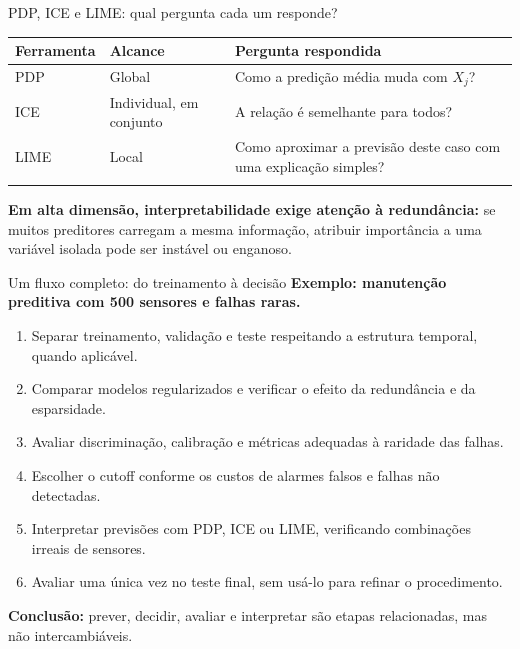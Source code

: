 \documentclass[
  10pt,
  ignorenonframetext,
  aspectratio=169,
  brazilian,
]{beamer}
\newcounter{none} %
\providecommand{\tightlist}{%
  \setlength{\itemsep}{0pt}\setlength{\parskip}{0pt}}
\begin{document}
\begin{frame}{PDP, ICE e LIME: qual pergunta cada um responde?}
\protect{}\label{pdp-ice-e-lime-qual-pergunta-cada-um-responde}
{\def\LTcaptype{none} %
\begin{longtable}[]{@{}
  >{\raggedright\arraybackslash}p{}
  >{\raggedright\arraybackslash}p{}
  >{\raggedright\arraybackslash}p{}@{}}
\toprule\noalign{}
\begin{minipage}[b]{\linewidth}\raggedright
Ferramenta
\end{minipage} & \begin{minipage}[b]{\linewidth}\raggedright
Alcance
\end{minipage} & \begin{minipage}[b]{\linewidth}\raggedright
Pergunta respondida
\end{minipage} \\
\midrule\noalign{}
\endhead
PDP & Global & Como a predição média muda com \(X_j\)? \\
ICE & Individual, em conjunto & A relação é semelhante para todos? \\
LIME & Local & Como aproximar a previsão deste caso com uma explicação
simples? \\
\bottomrule\noalign{}
\end{longtable}
}

\textbf{Em alta dimensão, interpretabilidade exige atenção à
redundância:} se muitos preditores carregam a mesma informação, atribuir
importância a uma variável isolada pode ser instável ou enganoso.
\end{frame}

\begin{frame}{Um fluxo completo: do treinamento à decisão}
\protect{}\label{um-fluxo-completo-do-treinamento-uxe0-decisuxe3o}
\textbf{Exemplo: manutenção preditiva com 500 sensores e falhas raras.}

\begin{enumerate}
\tightlist
\item
  Separar treinamento, validação e teste respeitando a estrutura
  temporal, quando aplicável.
\item
  Comparar modelos regularizados e verificar o efeito da redundância e
  da esparsidade.
\item
  Avaliar discriminação, calibração e métricas adequadas à raridade das
  falhas.
\item
  Escolher o cutoff conforme os custos de alarmes falsos e falhas não
  detectadas.
\item
  Interpretar previsões com PDP, ICE ou LIME, verificando combinações
  irreais de sensores.
\item
  Avaliar uma única vez no teste final, sem usá-lo para refinar o
  procedimento.
\end{enumerate}

\textbf{Conclusão:} prever, decidir, avaliar e interpretar são etapas
relacionadas, mas não intercambiáveis.
\end{frame}
\end{document}
